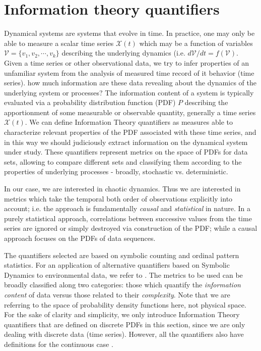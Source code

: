 \section{Information theory quantifiers}\label{sec:quanti}

Dynamical systems are systems that evolve in time.
In practice, one may only be able to measure a scalar time series ${\mathcal X}(t)$ which may be a function of variables ${\mathcal V}=\{ v_1,  v_2,\cdots, v_k\}$ describing the underlying dynamics (i.e. $d{\mathcal V}/dt=f({\mathcal V})$.
Given a time series or other observational data, we try to infer  properties of an unfamiliar system from  the analysis of measured time record of it behavior (time series).  
how much information are these data revealing about the dynamics of the underlying system or processes?
The information content of a system is typically evaluated via a probability distribution function (PDF) $P$ describing the apportionment of some measurable or observable quantity, generally a time series ${\mathcal X}(t)$. 
We can define Information Theory quantifiers as measures able to characterize relevant properties of the PDF associated with these time series, and in this way we should judiciously extract information on the dynamical system under study.
These quantifiers represent metrics on the space of PDFs for data sets, allowing to compare different sets and classifying them according to the properties of underlying processes - broadly, stochastic vs.  deterministic.

In our case, we are interested in chaotic dynamics.
Thus we are interested in metrics which take the temporal both order of observations explicitly into account; i.e. the approach is fundamentally \textit{causal} and \textit{statistical} in nature.
In a purely statistical approach, correlations between successive values from the time series are ignored or simply destroyed via construction of the PDF; while a causal approach focuses on the PDFs of data sequences.

The quantifiers selected are based on symbolic counting and ordinal pattern statistics.
For an application of alternative quantifiers based on Symbolic Dynamics to environmental data, we refer to \cite{Hauhs2008}.
The metrics to be used can be broadly classified along two categories: those which quantify the \textit{information content} of data versus those related to their \textit{complexity}.
Note that we are referring to the space of probability density functions here, not physical space.
For the sake of clarity and simplicity, we only introduce Information Theory quantifiers that are defined on discrete PDFs in this section, since we are only dealing with discrete data (time series).
However, all the quantifiers also have definitions for the continuous case \cite{Shannon1948,Frieden2004} . 

